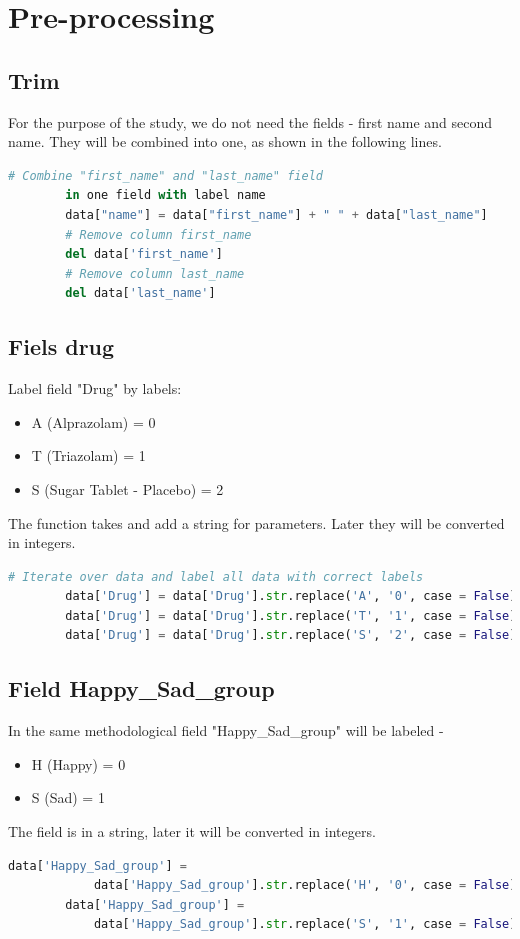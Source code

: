 \documentclass{article}
\begin{document}


    \section{Pre-processing}
    \subsection{Trim}
    For the purpose of the study, we do not need the fields - first name and second name. They will be combined into one, as shown in the following lines.
    \begin{lstlisting}[language=Python]
        # Combine "first_name" and "last_name" field
        in one field with label name
        data["name"] = data["first_name"] + " " + data["last_name"]
        # Remove column first_name
        del data['first_name']
        # Remove column last_name
        del data['last_name']
    \end{lstlisting}
    \subsection{Fiels drug}
    Label field "Drug" by labels:
    \begin{itemize}
        \item A (Alprazolam) = 0
        \item T (Triazolam) = 1
        \item S (Sugar Tablet - Placebo) = 2
    \end{itemize}
    The function takes and add a string for parameters.
    Later they will be converted in integers.
    \begin{lstlisting}[language=Python]
        # Iterate over data and label all data with correct labels
        data['Drug'] = data['Drug'].str.replace('A', '0', case = False)
        data['Drug'] = data['Drug'].str.replace('T', '1', case = False)
        data['Drug'] = data['Drug'].str.replace('S', '2', case = False)
    \end{lstlisting}
    \subsection{Field Happy\_Sad\_group}
    In the same methodological field "Happy\_Sad\_group" will be labeled -
    \begin{itemize}
        \item H (Happy) = 0
        \item S (Sad) = 1
    \end{itemize}
    The field is in a string, later it will be converted in integers.
    \begin{lstlisting}[language=Python]
        data['Happy_Sad_group'] =
            data['Happy_Sad_group'].str.replace('H', '0', case = False)
        data['Happy_Sad_group'] =
            data['Happy_Sad_group'].str.replace('S', '1', case = False)
    \end{lstlisting}
    \newpage
\end{document}

